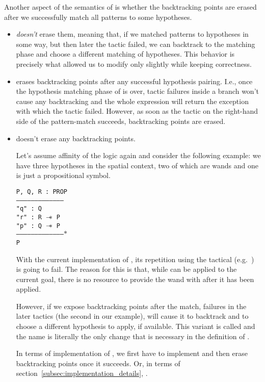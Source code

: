 Another aspect of the semantics of  is whether the backtracking points are erased after we successfully match all patterns to some hypotheses.
\begin{itemize}
\item {} \emph{doesn't} erase them, meaning that, if we matched patterns to hypotheses in some way, but then later the tactic failed, we can backtrack to the matching phase and choose a different matching of hypotheses.
This behavior is precisely what allowed us to modify  only slightly while keeping correctness.
\item {} erases backtracking points after any successful hypothesis pairing.
  I.e., once the hypothesis matching phase of  is over, tactic failures inside a branch won't cause any backtracking and the whole expression will return the exception with which the tactic failed.
  However, as soon as the tactic on the right-hand side of the pattern-match succeeds, backtracking points are erased.
\item {} doesn't erase any backtracking points.

  Let's assume affinity of the logic again and consider the following example:
  we have three hypotheses in the spatial context, two of which are wands and one is just a propositional symbol.

\begin{minipage}{1.0\linewidth}
\texttt{P, Q, R : PROP\\
---------------------------------------\\
"q" : Q\\
"r" : R $\mathrel{-\mkern-6mu*}$ P\\
"p" : Q $\mathrel{-\mkern-6mu*}$ P\\
--------------------------------------$\ast$\\
P}
\end{minipage}

With the current implementation of , its repetition using the  tactical (e.g.\ ) is going to fail.
The reason for this is that, while  can be applied to the current goal, there is no resource to provide the wand with after it has been applied.

However, if we expose backtracking points after the match, failures in the later tactics (the second  in our example), will cause it to backtrack and
to choose a different hypothesis to apply, if available.
This variant is called  and the name is literally the only change that is necessary in the definition of .

In terms of implementation of , we first have to implement  and then erase backtracking points once it succeeds.
Or, in terms of section~\ref{subsec:implementation_details}, .
\end{itemize}

